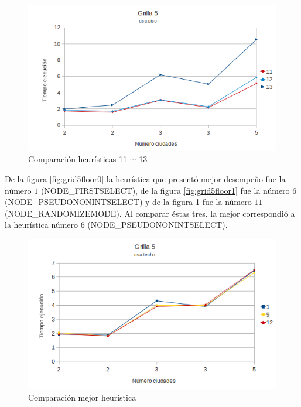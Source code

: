 \documentclass[a4paper,10pt]{article}
\begin{document}
\begin{figure}[ht]
\begin{minipage}[b]{1\linewidth}
  \centering
 \includegraphics[scale=0.4]{grilla5floor2.png}
 \caption{Comparación heurísticas  11 $\cdots$ 13}
 \label{fig:grid5floor2}
\end{minipage}

\end{figure}


De la figura \ref{fig:grid5floor0} la heurística que presentó mejor desempeño fue la número $1$ (NODE\_FIRSTSELECT), de la figura \ref{fig:grid5floor1} fue la número $6$ (NODE\_PSEUDONONINTSELECT) y de la 
figura \ref{fig:grid5floor2} fue la número $11$ (NODE\_RANDOMIZEMODE). Al comparar éstas tres, la mejor correspondió a la heurística número $6$ (NODE\_PSEUDONONINTSELECT).

\begin{figure}[ht]
\begin{minipage}[b]{1\linewidth}

 \centering
 \includegraphics[scale=0.4]{grilla5ceil3.png}
 \caption{Comparación mejor heurística}
 \label{fig:grid5floor3}
\end{minipage}
\end{figure}
\end{document}
